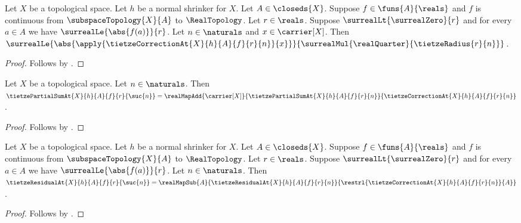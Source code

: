 \begin{corollary}\label{tietze_correction_bound}
    Let $X$ be a topological space.
    Let $h$ be a normal shrinker for $X$.
    Let $A\in\closeds{X}$.
    Suppose $f\in\funs{A}{\reals}$ and $f$ is continuous from
        $\subspaceTopology{X}{A}$ to $\RealTopology$.
    Let $r\in\reals$.
    Suppose $\surrealLt{\surrealZero}{r}$ and
        for every $a\in A$ we have $\surrealLe{\abs{f(a)}}{r}$.
    Let $n\in\naturals$ and $x\in\carrier[X]$.
    Then
        $\surrealLe{\abs{\apply{\tietzeCorrectionAt{X}{h}{A}{f}{r}{n}}{x}}}
            {\surrealMul{\realQuarter}{\tietzeRadius{r}{n}}}$.
\end{corollary}
\begin{proof}
    Follows by
        .
\end{proof}

\begin{corollary}\label{tietze_partial_sum_successor_eq}
    Let $X$ be a topological space.
    Let $n\in\naturals$.
    Then
        $\tietzePartialSumAt{X}{h}{A}{f}{r}{\suc{n}}
            =\realMapAdd{\carrier[X]}
                {\tietzePartialSumAt{X}{h}{A}{f}{r}{n}}
                {\tietzeCorrectionAt{X}{h}{A}{f}{r}{n}}$.
\end{corollary}
\begin{proof}
    Follows by .
\end{proof}

\begin{corollary}\label{tietze_residual_successor_eq}
    Let $X$ be a topological space.
    Let $h$ be a normal shrinker for $X$.
    Let $A\in\closeds{X}$.
    Suppose $f\in\funs{A}{\reals}$ and $f$ is continuous from
        $\subspaceTopology{X}{A}$ to $\RealTopology$.
    Let $r\in\reals$.
    Suppose $\surrealLt{\surrealZero}{r}$ and
        for every $a\in A$ we have $\surrealLe{\abs{f(a)}}{r}$.
    Let $n\in\naturals$.
    Then
        $\tietzeResidualAt{X}{h}{A}{f}{r}{\suc{n}}
            =\realMapSub{A}
                {\tietzeResidualAt{X}{h}{A}{f}{r}{n}}
                {\restrl{\tietzeCorrectionAt{X}{h}{A}{f}{r}{n}}{A}}$.
\end{corollary}
\begin{proof}
    Follows by
        .
\end{proof}

